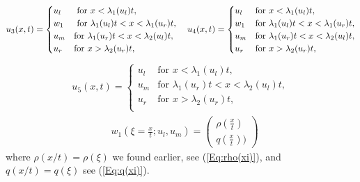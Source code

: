 \documentclass[10pt]{article}
\numberwithin{equation}{section}
\begin{document}
\begin{align}
    u_3(x,t) = \begin{cases}
    u_l  &\text{ for $x < \lambda_1(u_l)t$},\\
    w_1 &\text{ for $ \lambda_1(u_l)t < x < \lambda_1(u_r)t$},\\ 
    u_m &\text{for  $\lambda_1(u_r)t < x < \lambda_2(u_l)t$}, \\
    u_r &\text{for  $x > \lambda_2(u_r)t$}, \\
    \end{cases} \quad 
    u_4(x,t) = \begin{cases}
    u_l  &\text{for $x < \lambda_1(u_l)t$},\\
    w_1 &\text{for $\lambda_1(u_l)t < x < \lambda_1(u_r)t$}, \\ 
    u_m  &\text{for $\lambda_1(u_r)t < x < \lambda_2(u_l)t$}, \\
    u_r  &\text{for $x > \lambda_2(u_r)t$},
    \label{Eq:correspondingSolu3u4}
    \end{cases}
\end{align}
\begin{align}
    u_5(x,t) = \begin{cases}
    u_l & \text{for $x < \lambda_1(u_l)t$},\\
    u_m & \text{for $\lambda_1(u_r)t < x < \lambda_2(u_l)t$}, \\
    u_r & \text{for $x> \lambda_2(u_r)t$,} \\
    \end{cases}
    \label{Eq:u_5}
\end{align}
\begin{align*}
   & w_1(\xi = \frac{x}{t} ; u_l, u_m) = \begin{pmatrix} \rho(\frac{x}{t})  \\ q(\frac{x}{t}) ) \end{pmatrix} 
\end{align*}
where $\rho(x/t) = \rho(\xi)$ we found earlier, see (\ref{Eq:rho(xi)}), and $q(x/t) = q(\xi)$ see (\ref{Eq:q(xi)}). 
\end{document}
